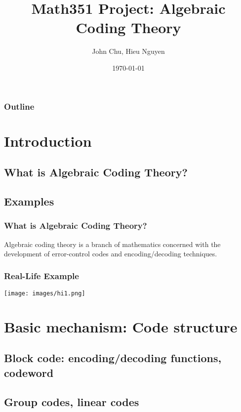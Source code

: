 \documentclass{beamer}
\title{Math351 Project: Algebraic Coding Theory}
\author{John Chu, Hieu Nguyen}
\institute{Dickinson College}
\date{\today}
\begin{document}
\begin{frame}
\titlepage
\end{frame}

\begin{frame}
\frametitle{Outline}
\tableofcontents
\end{frame}


\section{Introduction}
\subsection{What is Algebraic Coding Theory?}
\subsection{Examples} %


\begin{frame}
\frametitle{What is Algebraic Coding Theory?}
\begin{Definition}
{Algebraic coding theory is a branch of mathematics concerned with the development of error-control codes and encoding/decoding techniques.}
\end{Definition}
\end{frame}

\begin{frame}
\frametitle{Real-Life Example}
\centering
\texttt{[image: images/hi1.png]}
\end{frame}



\section{Basic mechanism: Code structure}
\subsection{Block code: encoding/decoding functions, codeword}
\subsection{Group codes, linear codes}
\end{document}
